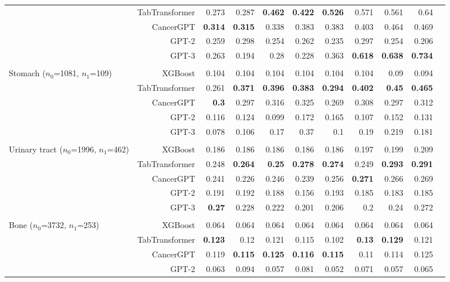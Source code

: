 \begin{adjustwidth}{-2.5cm}{-2.5cm}
\begin{threeparttable}[!htb]
\begin{tabular}{lrrrrrrrrrr}
&TabTransformer &0.273 &0.287 &\textbf{0.462} &\textbf{0.422} &\textbf{0.526} &0.571 &0.561 &0.64 \\
&CancerGPT &\textbf{0.314} &\textbf{0.315} &0.338 &0.383 &0.383 &0.403 &0.464 &0.469 \\
&GPT-2 &0.259 &0.298 &0.254 &0.262 &0.235 &0.297 &0.254 &0.206 \\
&GPT-3 &0.263 &0.194 &0.28 &0.228 &0.363 &\textbf{0.618} &\textbf{0.638} &\textbf{0.734} \\ \\
\multirowcell{5}{Stomach \\ ($n_0$=1081, $n_1$=109)} &XGBoost &0.104 &0.104 &0.104 &0.104 &0.104 &0.104 &0.09 &0.094 \\
&TabTransformer &0.261 &\textbf{0.371} &\textbf{0.396} &\textbf{0.383} &\textbf{0.294} &\textbf{0.402} &\textbf{0.45} &\textbf{0.465} \\
&CancerGPT &\textbf{0.3} &0.297 &0.316 &0.325 &0.269 &0.308 &0.297 &0.312 \\
&GPT-2 &0.116 &0.124 &0.099 &0.172 &0.165 &0.107 &0.152 &0.131 \\
&GPT-3 &0.078 &0.106 &0.17 &0.37 &0.1 &0.19 &0.219 &0.181 \\ \\
\multirowcell{5}{Urinary tract \\ ($n_0$=1996, $n_1$=462)} &XGBoost &0.186 &0.186 &0.186 &0.186 &0.186 &0.197 &0.199 &0.209 \\
&TabTransformer &0.248 &\textbf{0.264} &\textbf{0.25} &\textbf{0.278} &\textbf{0.274} &0.249 &\textbf{0.293} &\textbf{0.291} \\
&CancerGPT &0.241 &0.226 &0.246 &0.239 &0.256 &\textbf{0.271} &0.266 &0.269 \\
&GPT-2 &0.191 &0.192 &0.188 &0.156 &0.193 &0.185 &0.183 &0.185 \\
&GPT-3 &\textbf{0.27} &0.228 &0.222 &0.201 &0.206 &0.2 &0.24 &0.272 \\ \\
\multirowcell{5}{Bone \\ ($n_0$=3732, $n_1$=253)} &XGBoost &0.064 &0.064 &0.064 &0.064 &0.064 &0.064 &0.064 &0.064 \\
&TabTransformer &\textbf{0.123} &0.12 &0.121 &0.115 &0.102 &\textbf{0.13} &\textbf{0.129} &0.121 \\
&CancerGPT &0.119 &\textbf{0.115} &\textbf{0.125} &\textbf{0.116} &\textbf{0.115} &0.11 &0.114 &0.125 \\
&GPT-2 &0.063 &0.094 &0.057 &0.081 &0.052 &0.071 &0.057 &0.065 \\

\end{tabular}
\end{threeparttable}
\end{adjustwidth}
